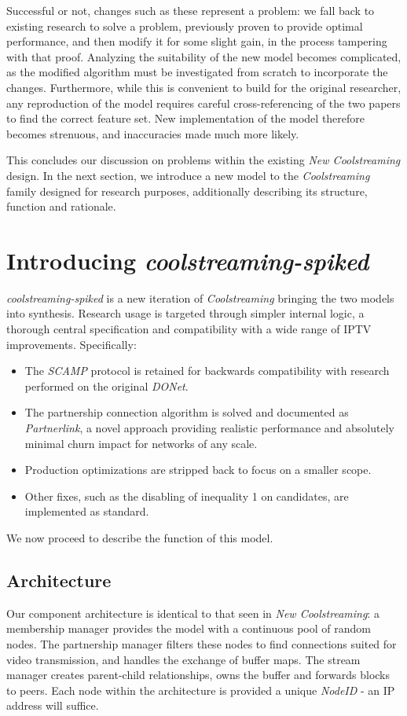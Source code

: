 \documentclass[12pt,a4paper]{article}
\begin{document}
Successful or not, changes such as these represent a problem: we fall back to existing research to solve a problem, previously proven to provide optimal performance, and then modify it for some slight gain, in the process tampering with that proof. Analyzing the suitability of the new model becomes complicated, as the modified algorithm must be investigated from scratch to incorporate the changes. Furthermore, while this is convenient to build for the original researcher, any reproduction of the model requires careful cross-referencing of the two papers to find the correct feature set. New implementation of the model therefore becomes strenuous, and inaccuracies made much more likely.

This concludes our discussion on problems within the existing \textit{New Coolstreaming} design. In the next section, we introduce a new model to the \textit{Coolstreaming} family designed for research purposes, additionally describing its structure, function and rationale.

\section{Introducing \textit{coolstreaming-spiked}} \label{css}
\textit{coolstreaming-spiked} is a new iteration of \textit{Coolstreaming} bringing the two models into synthesis. Research usage is targeted through simpler internal logic, a thorough central specification and compatibility with a wide range of IPTV improvements. Specifically:

\begin{itemize}
	\item The \textit{SCAMP} protocol is retained for backwards compatibility with research performed on the original \textit{DONet}.
	\item The partnership connection algorithm is solved and documented as \textit{Partnerlink}, a novel approach providing realistic performance and absolutely minimal churn impact for networks of any scale.
	\item Production optimizations are stripped back to focus on a smaller scope.
	\item Other fixes, such as the disabling of inequality 1 on candidates, are implemented as standard.
\end{itemize}

We now proceed to describe the function of this model.

\subsection{Architecture} \label{css:architecture}
Our component architecture is identical to that seen in \textit{New Coolstreaming}: a membership manager provides the model with a continuous pool of random nodes. The partnership manager filters these nodes to find connections suited for video transmission, and handles the exchange of buffer maps. The stream manager creates parent-child relationships, owns the buffer and forwards blocks to peers. Each node within the architecture is provided a unique \textit{NodeID} - an IP address will suffice.
\end{document}
